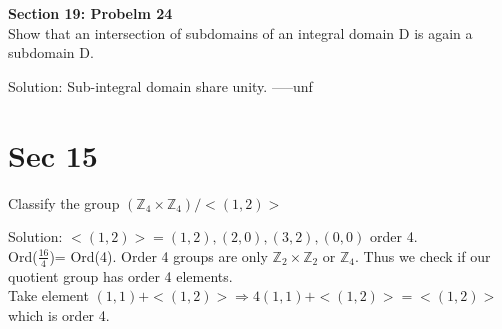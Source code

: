 \documentclass{article}
\newcommand\Z{\ensuremath{\mathbb{Z}}}
\begin{document}
\begin{Problem}
    \textbf{Section 19: Probelm 24}
    \\Show that an intersection of subdomains of an integral domain D is again a subdomain D. 
\end{Problem}
\begin{Solution}
    Solution: Sub-integral domain share unity. -----unf
\end{Solution}




\section{Sec 15}

\begin{Problem}
    Classify the group $(\Z_4 \times \Z_4)/<(1,2)>$
\end{Problem}
\begin{Solution}
    Solution: $<(1,2)> = (1,2), (2,0),(3,2),(0,0)$ order 4.
    \\Ord($\frac{16}{4}$)= Ord(4). Order 4 groups are only $\Z_2\times\Z_2$ or $\Z_4$. Thus we check if our quotient group has order 4 elements.
    \\Take element $(1,1) +<(1,2)> \Rightarrow 4(1,1) +<(1,2)> = <(1,2)>$ which is order 4. 
\end{Solution}
\end{document}
